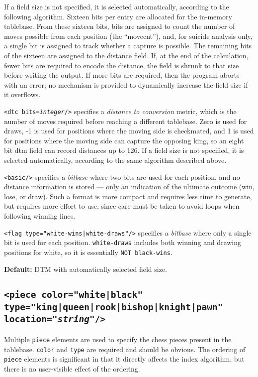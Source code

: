 \documentclass[11pt]{article}
\begin{document}
If a field size is not specified, it is selected automatically,
according to the following algorithm.  Sixteen bits per entry are
allocated for the in-memory tablebase.  From these sixteen bits, bits
are assigned to count the number of moves possible from each position
(the ``movecnt''), and, for suicide analysis only, a single bit is
assigned to track whether a capture is possible.  The remaining bits
of the sixteen are assigned to the distance field.  If, at the end of
the calculation, fewer bits are required to encode the distance, the
field is shrunk to that size before writing the output.  If more bits
are required, then the program aborts with an error; no mechanism is
provided to dynamically increase the field size if it overflows.

{\tt <dtc bits={\it integer}/>} specifies a {\it distance to
  conversion} metric, which is the number of moves required before
reaching a different tablebase.  Zero is used for draws, -1 is used
for positions where the moving side is checkmated, and 1 is used for
positions where the moving side can capture the opposing king, so an
eight bit dtm field can record distances up to 126.  If a field size
is not specified, it is selected automatically, according to the same
algorithm described above.

{\tt <basic/>} specifies a {\it bitbase} where two bits are used for
each position, and no distance information is stored --- only an
indication of the ultimate outcome (win, lose, or draw).  Such a format
is more compact and requires less time to generate, but requires more
effort to use, since care must be taken to avoid loops when following
winning lines.

{\tt <flag type="white-wins|white-draws"/>} specifies a {\it bitbase}
where only a single bit is used for each position.  {\tt white-draws}
includes both winning and drawing positions for white, so it is
essentially {\tt NOT black-wins}.

{\bf Default:} DTM with automatically selected field size.


\subsection{\tt <piece color="white|black" type="king|queen|rook|bishop|knight|pawn" \hfil\break\hbox{\qquad} location="{\it string}"/>}

Multiple {\tt piece} elements are used to specify the chess pieces
present in the tablebase. {\tt color} and {\tt type} are required and
should be obvious.  The ordering of {\tt piece} elements is
significant in that it directly affects the index algorithm,
but there is no user-visible effect of the ordering.
\end{document}
